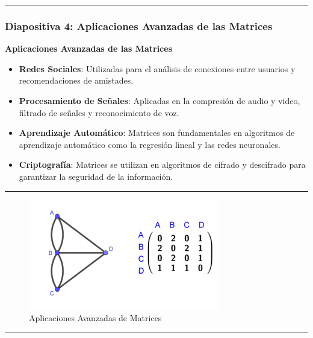 \documentclass[
  letterpaper,
  DIV=11,
  numbers=noendperiod]{scrartcl}
\providecommand{\tightlist}{%
  \setlength{\itemsep}{0pt}\setlength{\parskip}{0pt}}\usepackage{longtable,booktabs,array}
\begin{document}
\begin{center}\rule{0.5\linewidth}{0.5pt}\end{center}

\subsubsection{Diapositiva 4: Aplicaciones Avanzadas de las
Matrices}\label{diapositiva-4-aplicaciones-avanzadas-de-las-matrices}

\textbf{Aplicaciones Avanzadas de las Matrices}

\begin{itemize}
\tightlist
\item
  \textbf{Redes Sociales}: Utilizadas para el análisis de conexiones
  entre usuarios y recomendaciones de amistades.
\item
  \textbf{Procesamiento de Señales}: Aplicadas en la compresión de audio
  y video, filtrado de señales y reconocimiento de voz.
\item
  \textbf{Aprendizaje Automático}: Matrices son fundamentales en
  algoritmos de aprendizaje automático como la regresión lineal y las
  redes neuronales.
\item
  \textbf{Criptografía}: Matrices se utilizan en algoritmos de cifrado y
  descifrado para garantizar la seguridad de la información.
\end{itemize}

\begin{center}\rule{0.5\linewidth}{0.5pt}\end{center}

\begin{figure}[H]

{\centering \includegraphics{figures/grafo.png}

}

\caption{Aplicaciones Avanzadas de Matrices}

\end{figure}%

\begin{center}\rule{0.5\linewidth}{0.5pt}\end{center}
\end{document}
